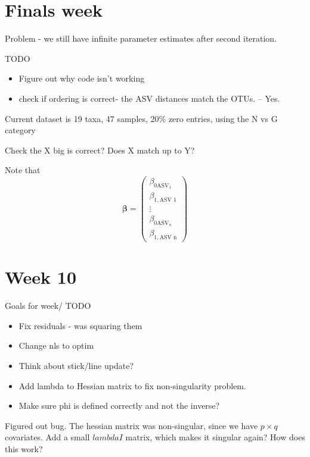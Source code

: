 \documentclass[10pt]{article}
\begin{document}
\section{Finals week}

Problem - we still have infinite parameter estimates after second iteration.


TODO
\begin{itemize}
  \item Figure out why code isn't working

  \item check if ordering is correct- the ASV distances match the OTUs. -- Yes.
\end{itemize}

Current dataset is 19 taxa, 47 samples, 20\% zero entries, using the N vs G category 


Check the X big is correct? Does X match up to Y?

Note that
\[\boldsymbol\beta = \begin{pmatrix}\beta_{0\text{ASV}_1} \\ \beta_{1, \text{ASV 1}} \\ \vdots \\ \beta_{0\text{ASV}_n} \\ \beta_{1, \text{ASV n}}\end{pmatrix} \]








\section{Week 10}

Goals for week/ TODO
\begin{itemize}
  \item Fix residuals - was squaring them

  \item Change nls to optim
  \item Think about stick/line update?
  \item Add lambda to Hessian matrix to fix non-singularity problem.
  \item Make sure phi is defined correctly and not the inverse?
\end{itemize}

Figured out bug. The hessian matrix was non-singular, since we have $p \times q$ covariates. Add a small $lambda I$ matrix, which makes it singular again? How does this work?
\end{document}
